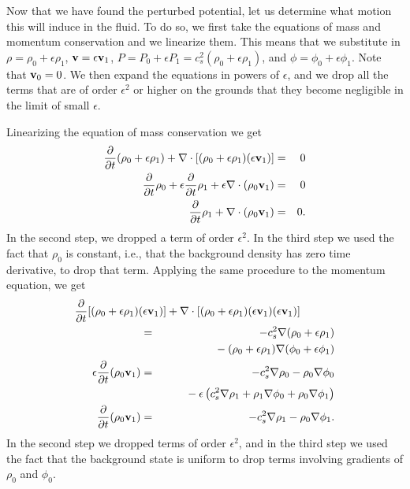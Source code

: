 Now that we have found the perturbed potential, let us determine what motion this will induce in the fluid. To do so, we first take the equations of mass and momentum conservation and we linearize them. This means that we substitute in $\rho = \rho_0 + \epsilon \rho_1$, $\mathbf{v}=\epsilon \mathbf{v}_1$, $P=P_0+\epsilon P_1=c_s^2 (\rho_0 + \epsilon \rho_1)$, and $\phi=\phi_0+\epsilon \phi_1$. Note that $\mathbf{v}_0 = 0$. We then expand the equations in powers of $\epsilon$, and we drop all the terms that are of order $\epsilon^2$ or higher on the grounds that they become negligible in the limit of small $\epsilon$.

Linearizing the equation of mass conservation we get
\begin{eqnarray}
\frac{\partial}{\partial t} (\rho_0 + \epsilon \rho_1) + \nabla\cdot [(\rho_0 + \epsilon \rho_1)(\epsilon\vecv_1)] & = & 0 \\
\frac{\partial}{\partial t} \rho_0 + \epsilon \frac{\partial}{\partial t} \rho_1 + \epsilon \nabla \cdot (\rho_0\vecv_1) & = & 0 \\
\frac{\partial}{\partial t} \rho_1+ \nabla \cdot (\rho_0\vecv_1) & = & 0.
\label{eq:masscons_linear}
\end{eqnarray}
In the second step, we dropped a term of order $\epsilon^2$. In the third step we used the fact that $\rho_0$ is constant, i.e., that the background density has zero time derivative, to drop that term. Applying the same procedure to the momentum equation, we get
\begin{eqnarray}
\nonumber
\lefteqn{
\frac{\partial}{\partial t} [(\rho_0 + \epsilon \rho_1)(\epsilon\vecv_1)] + \nabla\cdot [(\rho_0 + \epsilon \rho_1)(\epsilon\vecv_1)(\epsilon\vecv_1)] 
}
\qquad\qquad\qquad
\\
& = & -c_s^2 \nabla (\rho_0 + \epsilon \rho_1) \nonumber \\
& & \qquad {} - (\rho_0 + \epsilon\rho_1)\nabla (\phi_0 + \epsilon \phi_1)
\\
\epsilon \frac{\partial}{\partial t} (\rho_0\vecv_1) & = & -c_s^2 \nabla \rho_0 - \rho_0 \nabla\phi_0
\nonumber \\
& & \qquad {}
- \epsilon \left(c_s^2 \nabla \rho_1 + \rho_1\nabla \phi_0 + \rho_0\nabla \phi_1\right) \\
\frac{\partial}{\partial t} (\rho_0\vecv_1) & = & -c_s^2 \nabla \rho_1 - \rho_0\nabla\phi_1.
\label{eq:momcons_linear}
\end{eqnarray}
In the second step we dropped terms of order $\epsilon^2$, and in the third step we used the fact that the background state is uniform to drop terms involving gradients of $\rho_0$ and $\phi_0$.

